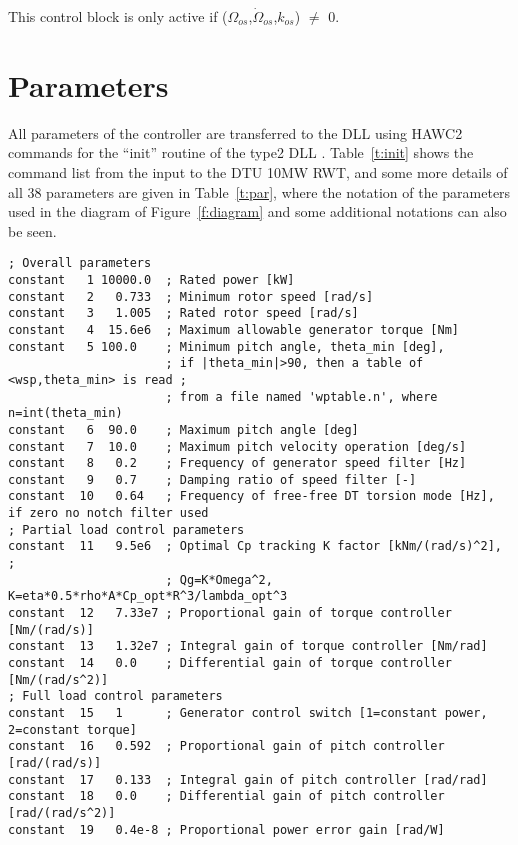 This control block is only active if ($\Omega_{os}$,$\dot{\Omega}_{os}$,$k_{os}$) $\neq$ 0.

\section{Parameters}\label{s:par}

All parameters of the controller are transferred to the DLL using HAWC2 commands for the ``init'' routine of the type2 DLL \cite{Larsen12}. Table~\ref{t:init} shows the command list from the input to the DTU 10MW RWT, and some more details of all 38 parameters are given in Table~\ref{t:par}, where the notation of the parameters used in the diagram of Figure~\ref{f:diagram} and some additional notations can also be seen.

\begin{table}[t!]
\begin{center}
\scriptsize
\begin{verbatim}
; Overall parameters
constant   1 10000.0  ; Rated power [kW]
constant   2   0.733  ; Minimum rotor speed [rad/s]
constant   3   1.005  ; Rated rotor speed [rad/s]
constant   4  15.6e6  ; Maximum allowable generator torque [Nm]
constant   5 100.0    ; Minimum pitch angle, theta_min [deg],
                      ; if |theta_min|>90, then a table of <wsp,theta_min> is read ;
                      ; from a file named 'wptable.n', where n=int(theta_min)
constant   6  90.0    ; Maximum pitch angle [deg]
constant   7  10.0    ; Maximum pitch velocity operation [deg/s]
constant   8   0.2    ; Frequency of generator speed filter [Hz]
constant   9   0.7    ; Damping ratio of speed filter [-]
constant  10   0.64   ; Frequency of free-free DT torsion mode [Hz], if zero no notch filter used
; Partial load control parameters
constant  11   9.5e6  ; Optimal Cp tracking K factor [kNm/(rad/s)^2], ;
                      ; Qg=K*Omega^2, K=eta*0.5*rho*A*Cp_opt*R^3/lambda_opt^3
constant  12   7.33e7 ; Proportional gain of torque controller [Nm/(rad/s)]
constant  13   1.32e7 ; Integral gain of torque controller [Nm/rad]
constant  14   0.0    ; Differential gain of torque controller [Nm/(rad/s^2)]
; Full load control parameters
constant  15   1      ; Generator control switch [1=constant power, 2=constant torque]
constant  16   0.592  ; Proportional gain of pitch controller [rad/(rad/s)]
constant  17   0.133  ; Integral gain of pitch controller [rad/rad]
constant  18   0.0    ; Differential gain of pitch controller [rad/(rad/s^2)]
constant  19   0.4e-8 ; Proportional power error gain [rad/W]

\end{verbatim}
\end{center}
\end{table}
